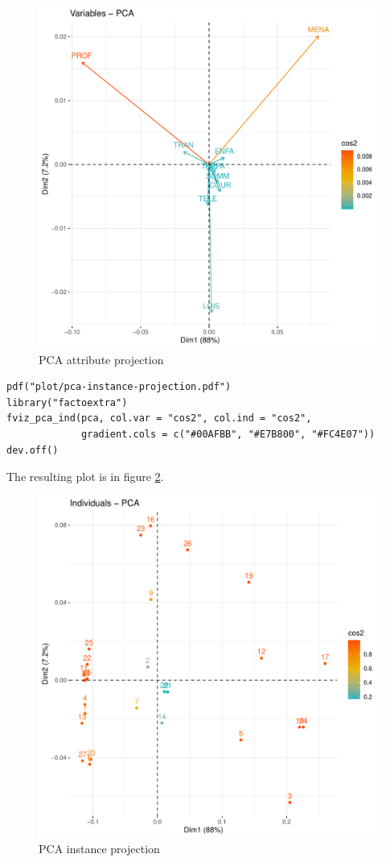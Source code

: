 \documentclass[11pt]{article}
\begin{document}
\begin{figure}[h]
  \centering
  \includegraphics[scale=0.4]{../plot/pca-attribute-projection.pdf}
  \caption{PCA attribute projection}
  \label{fig:pca-attribute-projection}
\end{figure}
\begin{verbatim}
pdf("plot/pca-instance-projection.pdf")
library("factoextra")
fviz_pca_ind(pca, col.var = "cos2", col.ind = "cos2",
             gradient.cols = c("#00AFBB", "#E7B800", "#FC4E07"))
dev.off()  
\end{verbatim}
The resulting plot is in figure \ref{fig:pca-instance-projection}.
\begin{figure}[h]
  \centering
  \includegraphics[scale=0.4]{../plot/pca-instance-projection.pdf}
  \caption{PCA instance projection}
  \label{fig:pca-instance-projection}
\end{figure}
\end{document}
